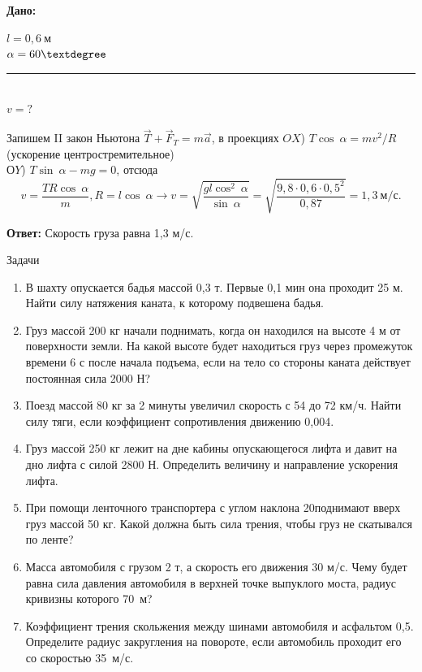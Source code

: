 \documentclass[a5paper, 10pt]{diss_4}
\renewcommand{\'}{\,'}
\begin{document}
\hspace{1cm}\textbf{Дано:}\hspace{.3cm}
\parbox[t]{4cm}{
$l = 0,6\ м$\\
$\alpha=60\textdegree$\\
\rule{4cm}{.4pt}\\
$v = ?$\\
}

Запишем II закон Ньютона $\vec{T}+\vec{F}_T=m\vec{a}$, в проекциях
$OX$) $T\cos\ \alpha=mv^2/R$ (ускорение центростремительное)\\
$ОY$) $T\sin\ \alpha-mg=0$, отсюда
\[
v=\frac{TR\cos\ \alpha}{m},R=l\cos\ \alpha\to
v=\sqrt{\frac{gl\cos^2\ \alpha}{\sin\ \alpha}}=\sqrt{\frac{9,8\cdot0,6\cdot0,5^2}{0,87}}=1,3\ м/с.
\]

\textbf{Ответ:} Скорость груза равна 1,3 м/с.

\begin{center}
   Задачи
\end{center}
\begin{enumerate}

\item В шахту опускается бадья массой 0,3 т. Первые 0,1 мин она проходит 25 м. Найти силу натяжения каната, к которому подвешена бадья.

\item Груз массой 200 кг начали поднимать, когда он находился на высоте 4 м от поверхности земли. На какой высоте будет находиться груз через промежуток времени 6 с после начала подъема, если на тело со стороны каната действует постоянная сила 2000 Н?

\item Поезд массой 80 кг за 2 минуты увеличил скорость с 54 до 72 км/ч. Найти силу тяги, если коэффициент сопротивления движению 0,004.

\item Груз массой 250 кг лежит на дне кабины опускающегося лифта и давит на дно лифта с силой 2800 Н. Определить величину и направление ускорения лифта.

\item При помощи ленточного транспортера с углом наклона 20\textdegree поднимают вверх груз массой 50 кг. Какой должна быть сила трения, чтобы груз не скатывался по ленте?

\item Масса автомобиля с грузом 2 т, а скорость его движения 30 м/с. Чему будет равна сила давления автомобиля в верхней точке выпуклого моста, радиус кривизны которого 70 м?

\item Коэффициент трения скольжения между шинами автомобиля и асфальтом 0,5. Определите радиус закругления на повороте, если автомобиль проходит его со скоростью 35 м/с.

\end{enumerate}
\end{document}
